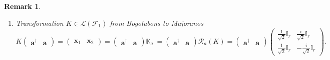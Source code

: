 \documentclass[aps,preprint]{revtex4}
\newtheorem{remark}[theorem]{Remark}
\begin{document}
\begin{remark}
\begin{enumerate}
\item Transformation $K\in \mathcal{L}\left( \mathcal{F}_{1}\right) $ from
Bogolubons to Majoranos 
\begin{equation}
K\left( 
\begin{array}{cc}
\mathbf{a}^{\dagger } & \mathbf{a}%
\end{array}%
\right) =\left( 
\begin{array}{cc}
\mathbf{x}_{1} & \mathbf{x}_{2}%
\end{array}%
\right) =\left( 
\begin{array}{cc}
\mathbf{a}^{\dagger } & \mathbf{a}%
\end{array}%
\right) \mathbb{K}_{a}\mathbb{\ }=\left( 
\begin{array}{cc}
\mathbf{a}^{\dagger } & \mathbf{a}%
\end{array}%
\right) \mathcal{R}_{a}\left( K\right) =\left( 
\begin{array}{cc}
\mathbf{a}^{\dagger } & \mathbf{a}%
\end{array}%
\right) \left( 
\begin{array}{cc}
\frac{1}{\sqrt{2}}\mathbb{I}_{r} & \frac{i}{\sqrt{2}}\mathbb{I}_{r} \\ 
\frac{1}{\sqrt{2}}\mathbb{I}_{r} & -\frac{i}{\sqrt{2}}\mathbb{I}_{r}%
\end{array}%
\right) .
\end{equation}


\end{enumerate}
\end{remark}
\end{document}

